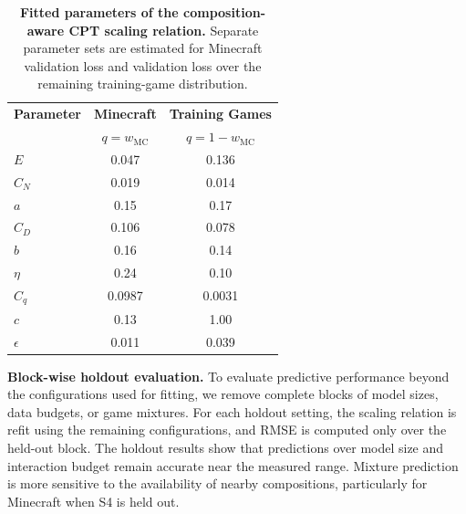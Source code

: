 \begin{table}[t]
    \centering
    \small
    \setlength{\tabcolsep}{5pt}
    \renewcommand{\arraystretch}{1.08}
    \begin{tabular}{lcc}
        \toprule
        \textbf{Parameter}
        & \textbf{Minecraft}
        & \textbf{Training Games} \\
        & $q=w_{\mathrm{MC}}$
        & $q=1-w_{\mathrm{MC}}$ \\
        \midrule
        
        $E$
        & 0.047
        & 0.136 \\
        
        $C_N$
        & 0.019
        & 0.014 \\
        
        $a$
        & 0.15
        & 0.17 \\
        
        $C_D$
        & 0.106
        & 0.078 \\
        
        $b$
        & 0.16
        & 0.14 \\
        
        $\eta$
        & 0.24
        & 0.10 \\
        
        $C_q$
        & 0.0987
        & 0.0031 \\
        
        $c$
        & 0.13
        & 1.00 \\
        
        $\epsilon$
        & 0.011
        & 0.039 \\
        
        \bottomrule
    \end{tabular}
    \caption{
    \textbf{Fitted parameters of the composition-aware CPT scaling relation.}
    Separate parameter sets are estimated for Minecraft validation loss and validation loss over the remaining training-game distribution.
    }
    \label{tab:scaling_parameters}
\end{table}

\textbf{Block-wise holdout evaluation.}
To evaluate predictive performance beyond the configurations used for fitting, we remove complete blocks of model sizes, data budgets, or game mixtures.
For each holdout setting, the scaling relation is refit using the remaining configurations, and RMSE is computed only over the held-out block. The holdout results show that predictions over model size and interaction budget remain accurate near the measured range.
Mixture prediction is more sensitive to the availability of nearby compositions, particularly for Minecraft when S4 is held out.

